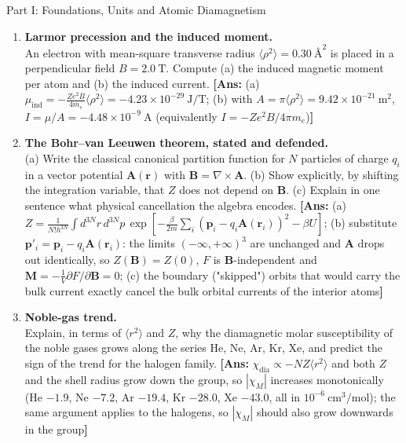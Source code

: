 \documentclass[11pt,a4paper]{article}
\newcommand{\vb}[1]{\mathbf{#1}}
\newcommand{\Ang}{\text{\AA}}
\begin{document}
\begin{assignmentbox}{Part I: Foundations, Units and Atomic Diamagnetism}
\begin{enumerate}[label=\textbf{I.\arabic*.}, leftmargin=*]
    \item \textbf{Larmor precession and the induced moment.}\\
    An electron with mean-square transverse radius $\langle\rho^2\rangle = 0.30\ \Ang^2$ is placed in a perpendicular field $B = 2.0\ \mathrm{T}$. Compute (a) the induced magnetic moment per atom and (b) the induced current.
    \textbf{[Ans:} (a) $\mu_{\mathrm{ind}} = -\frac{Ze^2B}{4m_e}\langle\rho^2\rangle = -4.23\times10^{-29}\ \mathrm{J/T}$; (b) with $A = \pi\langle\rho^2\rangle = 9.42\times10^{-21}\ \mathrm{m^2}$, $I = \mu/A = -4.48\times10^{-9}\ \mathrm{A}$ (equivalently $I = -Ze^2B/4\pi m_e$)\textbf{]}

    \item \textbf{The Bohr--van Leeuwen theorem, stated and defended.}\\
    (a) Write the classical canonical partition function for $N$ particles of charge $q_i$ in a vector potential $\vb{A}(\vb{r})$ with $\vb{B} = \nabla\times\vb{A}$.
    (b) Show explicitly, by shifting the integration variable, that $Z$ does not depend on $\vb{B}$.
    (c) Explain in one sentence what physical cancellation the algebra encodes.
    \textbf{[Ans:} (a) $Z = \frac{1}{N!h^{3N}}\int d^{3N}r\,d^{3N}p\,\exp[-\frac{\beta}{2m}\sum_i(\vb{p}_i-q_i\vb{A}(\vb{r}_i))^2 - \beta U]$; (b) substitute $\vb{p}'_i = \vb{p}_i - q_i\vb{A}(\vb{r}_i)$: the limits $(-\infty,+\infty)^3$ are unchanged and $\vb{A}$ drops out identically, so $Z(\vb{B}) = Z(0)$, $F$ is $\vb{B}$-independent and $\vb{M} = -\frac{1}{V}\partial F/\partial\vb{B} = 0$; (c) the boundary ("skipped") orbits that would carry the bulk current exactly cancel the bulk orbital currents of the interior atoms\textbf{]}

    \item \textbf{Noble-gas trend.}\\
    Explain, in terms of $\langle r^2\rangle$ and $Z$, why the diamagnetic molar susceptibility of the noble gases grows along the series He, Ne, Ar, Kr, Xe, and predict the sign of the trend for the halogen family.
    \textbf{[Ans:} $\chi_{\mathrm{dia}} \propto -NZ\langle r^2\rangle$ and both $Z$ and the shell radius grow down the group, so $|\chi_M|$ increases monotonically (He $-1.9$, Ne $-7.2$, Ar $-19.4$, Kr $-28.0$, Xe $-43.0$, all in $10^{-6}\ \mathrm{cm^3/mol}$); the same argument applies to the halogens, so $|\chi_M|$ should also grow downwards in the group\textbf{]}

\end{enumerate}
\end{assignmentbox}
\end{document}
